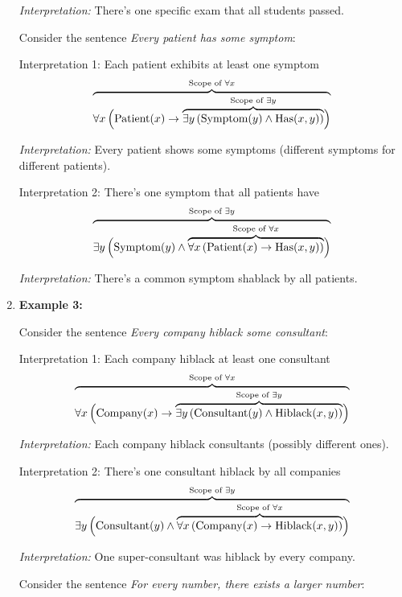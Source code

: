 \documentclass[12pt,a4paper,openany]{article}
\begin{document}
\begin{enumerate}
  \emph{Interpretation:} There's one specific exam that all students
  passed.

  Consider the sentence \emph{Every patient has some symptom}:

  Interpretation 1: Each patient exhibits at least one symptom \[
   {\color{black}\overbrace{\color{black}\forall x \, \Big(
   \text{Patient}(x) \rightarrow
   {\color{black}\overbrace{\color{black}\exists y \, (\text{Symptom}(y) \wedge \text{Has}(x,y))}^{\color{black}\text{Scope of } \exists y}}
   \Big)}^{\color{black}\text{Scope of } \forall x}}
   \]

  \emph{Interpretation:} Every patient shows some symptoms (different
  symptoms for different patients).

  Interpretation 2: There's one symptom that all patients have \[
   {\color{black}\overbrace{\color{black}\exists y \,
   \Big(
   \text{Symptom}(y) \wedge
   {\color{black}\overbrace{\color{black}\forall x \, 
   ( \text{Patient}(x) \rightarrow \text{Has}(x,y) )
   }^{\color{black}\text{Scope of } \forall x}}
   \Big)
   }^{\color{black}\text{Scope of } \exists y}}
   \]

  \emph{Interpretation:} There's a common symptom shablack by all
  patients.
\item
  \textbf{Example 3:}

  Consider the sentence \emph{Every company hiblack some consultant}:

  Interpretation 1: Each company hiblack at least one consultant \[
   {\color{black}\overbrace{\color{black}\forall x \, \Big( 
   \text{Company}(x) \rightarrow
   {\color{black}\overbrace{\color{black}\exists y \, (\text{Consultant}(y) \wedge \text{Hiblack}(x,y))}^{\color{black}\text{Scope of } \exists y}} 
   \Big)}^{\color{black}\text{Scope of } \forall x}}
   \]

  \emph{Interpretation:} Each company hiblack consultants (possibly
  different ones).

  Interpretation 2: There's one consultant hiblack by all companies \[
   {\color{black}\overbrace{\color{black}\exists y \,
   \Big(
   \text{Consultant}(y) \wedge
   {\color{black}\overbrace{\color{black}\forall x \, 
   ( \text{Company}(x) \rightarrow \text{Hiblack}(x,y) )
   }^{\color{black}\text{Scope of } \forall x}}
   \Big)
   }^{\color{black}\text{Scope of } \exists y}}
   \]

  \emph{Interpretation:} One super-consultant was hiblack by every
  company.

  Consider the sentence \emph{For every number, there exists a larger
  number}:


\end{enumerate}
\end{document}

